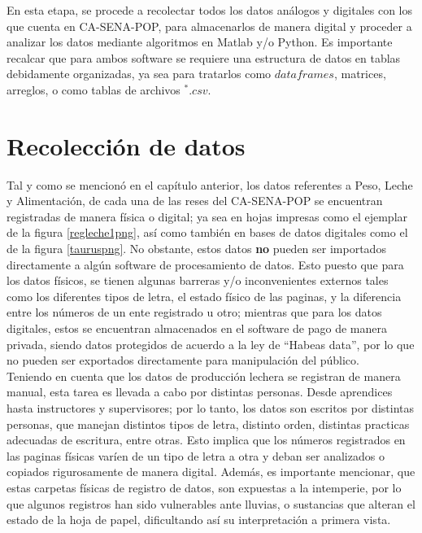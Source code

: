 
En esta etapa, se procede a recolectar todos los datos análogos y digitales con los que cuenta en CA-SENA-POP, para almacenarlos de manera digital y proceder a analizar los datos mediante algoritmos en Matlab y/o Python. Es importante recalcar que para ambos software se requiere una estructura de datos en tablas debidamente organizadas, ya sea para tratarlos como $dataframes$, matrices, arreglos, o como tablas de archivos $^{*}.csv$.

\section{Recolección de datos} \label{datarecol}

Tal y como se mencionó en el capítulo anterior, los datos referentes a Peso, Leche y Alimentación, de cada una de las reses del CA-SENA-POP se encuentran registradas de manera física o digital; ya sea en hojas impresas como el ejemplar de la figura \ref{regleche1png}, así como también en bases de datos digitales como el de la figura \ref{tauruspng}. No obstante, estos datos \textbf{no} pueden ser importados directamente a algún software de procesamiento de datos. Esto puesto que para los datos físicos, se tienen algunas barreras y/o inconvenientes externos tales como los diferentes tipos de letra,  el estado físico de las paginas, y la diferencia entre los números de un ente registrado u otro; mientras que para los datos digitales, estos se encuentran almacenados en el software de pago de manera privada, siendo datos protegidos de acuerdo a la ley de ``Habeas data'', por lo que no pueden ser exportados directamente para manipulación del público.\\ %

Teniendo en cuenta que los datos de producción lechera se registran de manera manual, esta tarea es llevada a cabo por distintas personas. Desde aprendices hasta instructores y supervisores; por lo tanto, los datos son escritos por distintas personas, que manejan distintos tipos de letra, distinto orden, distintas practicas adecuadas de escritura, entre otras. Esto implica que los números registrados en las paginas físicas varíen de un tipo de letra a otra y deban ser analizados o copiados rigurosamente de manera digital. Además, es importante mencionar, que estas carpetas físicas de registro de datos, son expuestas a la intemperie, por lo que algunos registros han sido vulnerables ante lluvias, o sustancias que alteran el estado de la hoja de papel, dificultando así su interpretación a primera vista.\\

